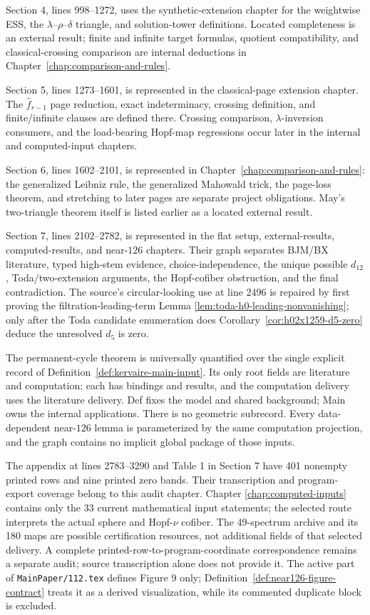 Section 4, lines 998--1272, uses the synthetic-extension chapter for the
weightwise ESS, the $\lambda$--$\rho$--$\delta$ triangle, and solution-tower
definitions.  Located completeness is an external result; finite and infinite
target formulas, quotient compatibility, and classical-crossing comparison
are internal deductions in Chapter~\ref{chap:comparison-and-rules}.

Section 5, lines 1273--1601, is represented in the classical-page extension
chapter.  The $\widehat f_{r-1}$ page reduction, exact indeterminacy, crossing
definition, and finite/infinite clauses are defined there.  Crossing
comparison, $\lambda$-inversion consumers, and the load-bearing Hopf-map
regressions occur later in the internal and computed-input chapters.

Section 6, lines 1602--2101, is represented in
Chapter~\ref{chap:comparison-and-rules}: the generalized Leibniz rule, the
generalized Mahowald trick, the page-loss theorem, and stretching to later
pages are separate project obligations.  May's two-triangle theorem itself is
listed earlier as a located external result.

Section 7, lines 2102--2782, is represented in
the flat setup, external-results, computed-results, and near-$126$ chapters.
Their graph separates BJM/BX literature, typed high-stem evidence,
choice-independence, the unique possible $d_{12}$,
Toda/two-extension arguments, the Hopf-cofiber obstruction, and the final
contradiction.  The source's circular-looking use at line 2496 is repaired by
first proving the filtration-leading-term Lemma
\ref{lem:toda-h0-leading-nonvanishing}; only after the Toda candidate
enumeration does Corollary~\ref{cor:h02x1259-d5-zero} deduce the unresolved
$d_5$ is zero.

The permanent-cycle theorem is universally quantified over the single
explicit record of Definition~\ref{def:kervaire-main-input}. Its only root
fields are literature and computation; each has bindings and results, and the
computation delivery uses the literature delivery. Def fixes the model and
shared background; Main owns the internal applications. There is no geometric
subrecord.
Every data-dependent near-$126$ lemma is parameterized by the same computation
projection, and the graph contains no implicit global package of those inputs.

The appendix at lines 2783--3290 and Table 1 in Section 7 have 401
nonempty printed rows and nine printed zero bands. Their transcription and
program-export coverage belong to this audit chapter. Chapter
\ref{chap:computed-inputs} contains only the 33 current mathematical input
statements; the selected route interprets the actual sphere and Hopf-$\nu$
cofiber. The 49-spectrum archive and its 180 maps are possible certification
resources, not additional fields of that selected delivery. A complete
printed-row-to-program-coordinate correspondence remains a separate audit;
source transcription alone does not provide it.
The active part of \texttt{MainPaper/112.tex} defines Figure 9 only;
Definition~\ref{def:near126-figure-contract} treats it as a derived
visualization, while its commented duplicate block is excluded.

